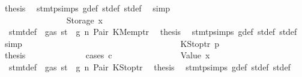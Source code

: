 \begin{isabellebody}
\ {\isacharquery}{\kern0pt}thesis\ \isamarkupfalse%
\ stmt{\isachardot}{\kern0pt}psimps{\isacharparenleft}{\kern0pt}{}{\isacharparenright}{\kern0pt}\ g{\isacharunderscore}{\kern0pt}def\ st{\isacharprime}{\kern0pt}{\isacharunderscore}{\kern0pt}def\ st{\isacharprime}{\kern0pt}{\isacharprime}{\kern0pt}{\isacharunderscore}{\kern0pt}def\ \isamarkupfalse%
\ simp\isanewline
\ \ \ \ \ \ \ \ \ \ \ \ \ \ \isamarkupfalse%
\isanewline
\ \ \ \ \ \ \ \ \ \ \ \ \isamarkupfalse%
\isanewline
\ \ \ \ \ \ \ \ \ \ \ \ \ \ \isamarkupfalse%
\ {\isacharparenleft}{\kern0pt}Storage\ x{}{\isacharparenright}{\kern0pt}\isanewline
\ \ \ \ \ \ \ \ \ \ \ \ \ \ \isamarkupfalse%
\ {}{\isacharparenleft}{\kern0pt}{}{\isacharparenright}{\kern0pt}\ stmt{\isacharunderscore}{\kern0pt}def\ {\isacharbackquoteopen}{\isasymnot}\ gas\ st\ {\isasymle}\ g{\isacharbackquoteclose}\ n\ Pair\ KMemptr\ \isamarkupfalse%
\ {\isacharquery}{\kern0pt}thesis\ \isamarkupfalse%
\ stmt{\isachardot}{\kern0pt}psimps{\isacharparenleft}{\kern0pt}{}{\isacharparenright}{\kern0pt}\ g{\isacharunderscore}{\kern0pt}def\ st{\isacharprime}{\kern0pt}{\isacharunderscore}{\kern0pt}def\ st{\isacharprime}{\kern0pt}{\isacharprime}{\kern0pt}{\isacharunderscore}{\kern0pt}def\ \isamarkupfalse%
\ simp\isanewline
\ \ \ \ \ \ \ \ \ \ \ \ \isamarkupfalse%
\isanewline
\ \ \ \ \ \ \ \ \ \ \isamarkupfalse%
\isanewline
\ \ \ \ \ \ \ \ \ \ \ \ \isamarkupfalse%
\ {\isacharparenleft}{\kern0pt}KStoptr\ p{\isacharparenright}{\kern0pt}\isanewline
\ \ \ \ \ \ \ \ \ \ \ \ \isamarkupfalse%
\ \isamarkupfalse%
\ {\isacharquery}{\kern0pt}thesis\isanewline
\ \ \ \ \ \ \ \ \ \ \ \ \isamarkupfalse%
\ {\isacharparenleft}{\kern0pt}cases\ c{\isacharparenright}{\kern0pt}\isanewline
\ \ \ \ \ \ \ \ \ \ \ \ \ \ \isamarkupfalse%
\ {\isacharparenleft}{\kern0pt}Value\ x{}{\isacharparenright}{\kern0pt}\isanewline
\ \ \ \ \ \ \ \ \ \ \ \ \ \ \isamarkupfalse%
\ {}{\isacharparenleft}{\kern0pt}{}{\isacharparenright}{\kern0pt}\ stmt{\isacharunderscore}{\kern0pt}def\ {\isacharbackquoteopen}{\isasymnot}\ gas\ st\ {\isasymle}\ g{\isacharbackquoteclose}\ n\ Pair\ KStoptr\ \isamarkupfalse%
\ {\isacharquery}{\kern0pt}thesis\ \isamarkupfalse%
\ stmt{\isachardot}{\kern0pt}psimps{\isacharparenleft}{\kern0pt}{}{\isacharparenright}{\kern0pt}\ g{\isacharunderscore}{\kern0pt}def\ st{\isacharprime}{\kern0pt}{\isacharunderscore}{\kern0pt}def\ st{\isacharprime}{\kern0pt}{\isacharprime}{\kern0pt}{\isacharunderscore}{\kern0pt}def\ \isamarkupfalse%

\end{isabellebody}

